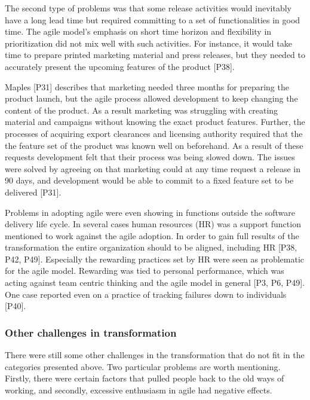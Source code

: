 The second type of problems was that some release activities would inevitably
have a long lead time but required committing to a set of functionalities in
good time. The agile model's emphasis on short time horizon and flexibility in
prioritization did not mix well with such activities.
For instance, it would take time to prepare printed marketing material and press
releases, but they needed to accurately present the upcoming features of the
product [P38].

Maples [P31] describes that marketing needed three months for preparing the
product launch, but the agile process allowed development to keep changing the
content of the product. As a result marketing was struggling with creating
material and campaigns without knowing the exact product features. Further, the
processes of acquiring export clearances and licensing authority required that
the the feature set of the product was known well on beforehand.
As a result of these requests development felt that their process was being
slowed down. The issues were solved by agreeing on that marketing could at any
time request a release in 90 days, and development would be able to commit to a
fixed feature set to be delivered [P31].


Problems in adopting agile were even showing in functions outside the software
delivery life cycle. In several cases human resources (HR) was a support function
mentioned to work against the agile adoption. In order to gain full results of
the transformation the entire organization should to be aligned, including HR
[P38, P42, P49].
Especially the rewarding practices set by HR were seen as problematic for the
agile model. Rewarding was tied to personal performance, which was acting
against team centric thinking and the agile model in general [P3, P6, P49].
One case reported even on a practice of tracking failures down to individuals
[P40].


\subsubsection{Other challenges in transformation}

There were still some other challenges in the transformation that do not fit in
the categories presented above. Two particular problems are worth mentioning.
Firstly, there were certain factors that pulled people back to the old ways of
working, and secondly, excessive enthusiasm in agile had negative effects.

